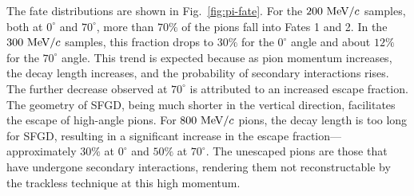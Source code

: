           The fate distributions are shown in Fig.~\ref{fig:pi-fate}. 
          For the $200~\textrm{MeV}/c$ samples, both at $0^\circ$ and $70^\circ$, more than $70\%$ of the pions fall into Fates 1 and 2. 
          In the $300~\textrm{MeV}/c$ samples, this fraction drops to $30\%$ for the $0^\circ$ angle and about $12\%$ for the $70^\circ$ angle. 
          This trend is expected because as pion momentum increases, the decay length increases, and the probability of secondary interactions rises. 
          The further decrease observed at $70^\circ$ is attributed to an increased escape fraction. 
          The geometry of SFGD, being much shorter in the vertical direction, facilitates the escape of high-angle pions. 
          For $800~\textrm{MeV}/c$ pions, the decay length is too long for SFGD, resulting in a significant increase in the escape fraction—approximately $30\%$ at $0^\circ$ and $50\%$ at $70^\circ$. 
          The unescaped pions are those that have undergone secondary interactions, rendering them not reconstructable by the trackless technique at this high momentum.
